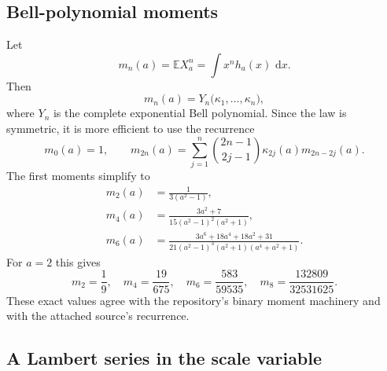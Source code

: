 \documentclass[11pt,oneside]{article}
\numberwithin{equation}{section}
\theoremstyle{definition}
\theoremstyle{remark}
\newcommand{\E}{\mathbb E}
\newcommand{\dd}{\,\mathrm d}
\begin{document}
\subsection{Bell-polynomial moments}

Let
\[
 m_n(a)=\E X_a^n=\int x^nh_a(x)\,\dd x.
\]
Then
\begin{equation}\label{p6:eq:bell-moments}
 m_n(a)=Y_n\bigl(\kappa_1,\ldots,\kappa_n\bigr),
\end{equation}
where $Y_n$ is the complete exponential Bell polynomial.  Since the law is
symmetric, it is more efficient to use the recurrence
\begin{equation}\label{p6:eq:moment-recurrence}
 m_0(a)=1,
 \qquad
 m_{2n}(a)=\sum_{j=1}^{n}
 \binom{2n-1}{2j-1}
 \kappa_{2j}(a)m_{2n-2j}(a).
\end{equation}
The first moments simplify to
\begin{align}
 m_2(a)&=\frac1{3(a^2-1)},\label{p6:eq:m2}\\
 m_4(a)&=\frac{3a^2+7}{15(a^2-1)^2(a^2+1)},\label{p6:eq:m4}\\
 m_6(a)&=
 \frac{3a^6+18a^4+18a^2+31}
 {21(a^2-1)^3(a^2+1)(a^4+a^2+1)}.\label{p6:eq:m6}
\end{align}
For $a=2$ this gives
\begin{equation}\label{p6:eq:binary-moments}
 m_2=\frac19,
 \quad m_4=\frac{19}{675},
 \quad m_6=\frac{583}{59535},
 \quad m_8=\frac{132809}{32531625}.
\end{equation}
These exact values agree with the repository's binary moment machinery and with
the attached source's recurrence.

\subsection{A Lambert series in the scale variable}
\end{document}
